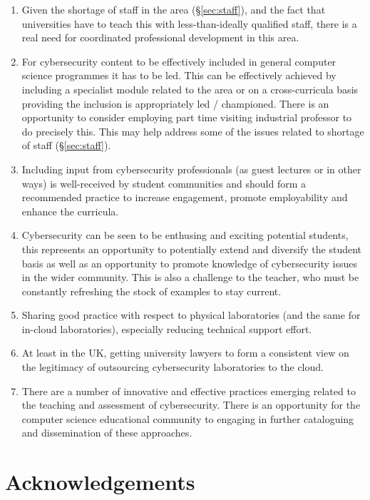 \documentclass[conference]{IEEEtran}
\begin{document}
\begin{enumerate}
\item Given the shortage of staff in the area (\S\ref{sec:staff}), and
the fact that universities have to teach this with less-than-ideally
qualified staff, there is a real need for coordinated professional
development in this area.
\item For cybersecurity content to be effectively included in general
computer science programmes it has to be led. This can be effectively
achieved by including a specialist module related to the area or on a
cross-curricula basis providing the inclusion is appropriately led /
championed. There is an opportunity to consider employing part time
visiting industrial professor to do precisely this. This may help
address some of the issues related to shortage of staff
(\S\ref{sec:staff}).
\item Including input from cybersecurity professionals (as guest
lectures or in other ways) is well-received by student communities and
should form a recommended practice to increase engagement, promote
employability and enhance the curricula.
\item Cybersecurity can be seen to be enthusing and exciting potential
students, this represents an opportunity to potentially extend and
diversify the student basis as well as an opportunity to promote
knowledge of cybersecurity issues in the wider community. This is also
a challenge to the teacher, who must be constantly refreshing the
stock of examples to stay current.
\item Sharing good practice with respect to physical laboratories (and
the same for in-cloud laboratories), especially reducing technical
support effort.
\item At least in the UK, getting university lawyers to form a
consistent view on the legitimacy of outsourcing cybersecurity
laboratories to the cloud.
\item There are a number of innovative and effective practices
emerging related to the teaching and assessment of
cybersecurity. There is an opportunity for the computer science
educational community to engaging in further cataloguing and
dissemination of these approaches.
\end{enumerate}

\section*{Acknowledgements}

\end{document}

